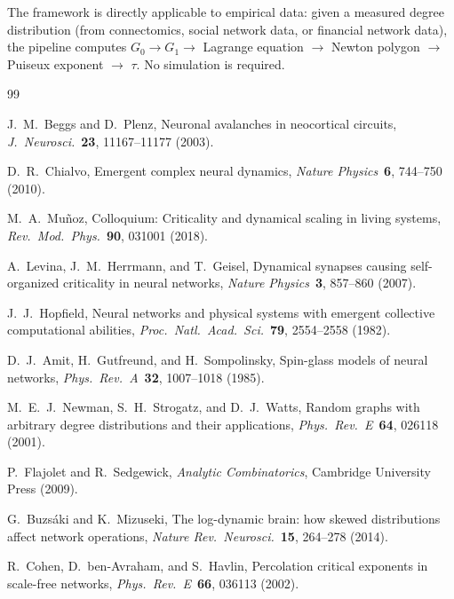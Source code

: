 \documentclass[11pt,a4paper]{article}
\theoremstyle{definition}
\begin{document}
The framework is directly applicable to empirical data: given a measured
degree distribution (from connectomics, social network data, or financial
network data), the pipeline computes $G_0 \to G_1 \to$ Lagrange equation
$\to$ Newton polygon $\to$ Puiseux exponent $\to$ $\tau$. No simulation
is required.


\begin{thebibliography}{99}

J.~M.~Beggs and D.~Plenz,
\newblock Neuronal avalanches in neocortical circuits,
\newblock \emph{J.\ Neurosci.}\ \textbf{23}, 11167--11177 (2003).

D.~R.~Chialvo,
\newblock Emergent complex neural dynamics,
\newblock \emph{Nature Physics}\ \textbf{6}, 744--750 (2010).

M.~A.~Mu\~noz,
\newblock Colloquium: Criticality and dynamical scaling in living systems,
\newblock \emph{Rev.\ Mod.\ Phys.}\ \textbf{90}, 031001 (2018).

A.~Levina, J.~M.~Herrmann, and T.~Geisel,
\newblock Dynamical synapses causing self-organized criticality in neural
networks,
\newblock \emph{Nature Physics}\ \textbf{3}, 857--860 (2007).

J.~J.~Hopfield,
\newblock Neural networks and physical systems with emergent collective
computational abilities,
\newblock \emph{Proc.\ Natl.\ Acad.\ Sci.}\ \textbf{79}, 2554--2558 (1982).

D.~J.~Amit, H.~Gutfreund, and H.~Sompolinsky,
\newblock Spin-glass models of neural networks,
\newblock \emph{Phys.\ Rev.\ A}\ \textbf{32}, 1007--1018 (1985).

M.~E.~J.~Newman, S.~H.~Strogatz, and D.~J.~Watts,
\newblock Random graphs with arbitrary degree distributions and their
applications,
\newblock \emph{Phys.\ Rev.\ E}\ \textbf{64}, 026118 (2001).

P.~Flajolet and R.~Sedgewick,
\newblock \emph{Analytic Combinatorics}, Cambridge University Press (2009).

G.~Buzs\'aki and K.~Mizuseki,
\newblock The log-dynamic brain: how skewed distributions affect network
operations,
\newblock \emph{Nature Rev.\ Neurosci.}\ \textbf{15}, 264--278 (2014).

R.~Cohen, D.~ben-Avraham, and S.~Havlin,
\newblock Percolation critical exponents in scale-free networks,
\newblock \emph{Phys.\ Rev.\ E}\ \textbf{66}, 036113 (2002).

\end{thebibliography}
\end{document}
